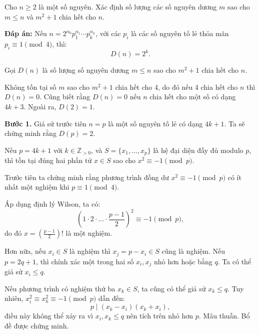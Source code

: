 \ifshowproblemandsoln
\ifshowproblem\begin{problem}\label{problem:MEMO-2015-T-P8}\fi
\ifshowsoln\begin{problem}\fi
    Cho \( n \ge 2 \) là một số nguyên.  
    Xác định số lượng các số nguyên dương \( m \) sao cho \( m \le n \) và \( m^2 + 1 \) chia hết cho \( n \).
\end{problem}
\fi

\ifshowsoln
\begin{soln}\footnotemark
    \textbf{Đáp án:} Nếu \( n = 2^{\alpha_0} p_1^{\alpha_1} \cdots p_k^{\alpha_k} \), 
    với các \( p_i \) là các số nguyên tố lẻ thỏa mãn \( p_i \equiv 1 \pmod{4} \), thì:
    \[
        D(n) = 2^k.
    \]

    Gọi \( D(n) \) là số lượng số nguyên dương \( m \leq n \) sao cho \( m^2 + 1 \) chia hết cho \( n \).

    Không tồn tại số \( m \) sao cho \( m^2 + 1 \) chia hết cho 4, do đó nếu 4 chia hết cho \( n \) thì \( D(n) = 0 \). 
    Cũng biết rằng \( D(n) = 0 \) nếu \( n \) chia hết cho một số có dạng \( 4k + 3 \). Ngoài ra, \( D(2) = 1 \).

    \textbf{Bước 1.} Giả sử trước tiên \( n = p \) là một số nguyên tố lẻ có dạng \( 4k + 1 \). Ta sẽ chứng minh rằng \( D(p) = 2 \).

    \begin{lemma*}[Bổ đề 1]
        Nếu \( p = 4k + 1 \) với \( k \in \mathbb{Z}_{>0} \), và \( S = \{x_1, \ldots, x_p\} \) là hệ đại diện đầy đủ modulo \( p \),
        thì tồn tại đúng hai phần tử \( x \in S \) sao cho \( x^2 \equiv -1 \pmod{p} \).
    \end{lemma*}
    \begin{subproof}
        Trước tiên ta chứng minh rằng phương trình đồng dư \( x^2 \equiv -1 \pmod{p} \) có ít nhất một nghiệm khi \( p \equiv 1 \pmod{4} \).

        Áp dụng định lý Wilson, ta có:
        \[
            \left(1 \cdot 2 \cdot \ldots \cdot \frac{p-1}{2} \right)^2 \equiv -1 \pmod{p},
        \]
        do đó \( x = \left( \frac{p - 1}{2} \right)! \) là một nghiệm.
    
        Hơn nữa, nếu \( x_i \in S \) là nghiệm thì \( x_j = p - x_i \in S \) cũng là nghiệm. 
        Nếu \( p = 2q + 1 \), thì chính xác một trong hai số \( x_i, x_j \) nhỏ hơn hoặc bằng \( q \). Ta có thể giả sử \( x_i \leq q \).
    
        Nếu phương trình có nghiệm thứ ba \( x_k \in S \), ta cũng có thể giả sử \( x_k \leq q \). 
        Tuy nhiên, \( x_i^2 \equiv x_k^2 \equiv -1 \pmod{p} \) dẫn đến:
        \[
            p \mid (x_k - x_i)(x_k + x_i),
        \]
        điều này không thể xảy ra vì \( x_i, x_k \leq q \) nên tích trên nhỏ hơn \( p \). Mâu thuẫn. Bổ đề được chứng minh.
    \end{subproof}


\end{soln}
\end{problem}

